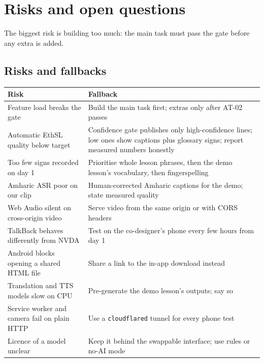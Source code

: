 \documentclass[11pt,a4paper]{article}
\newcommand{\code}[1]{\texttt{#1}}
\begin{document}
\section{Risks and open questions}

The biggest risk is building too much: the main task must pass the gate before any extra is added.

\subsection{Risks and fallbacks}
\begin{xltabular}{\textwidth}{@{}>{\raggedright\arraybackslash}p{5.6cm} X@{}}
\toprule
\textbf{Risk} & \textbf{Fallback} \\
\midrule
\endhead
Feature load breaks the gate & Build the main task first; extras only after AT-02 passes \\
Automatic EthSL quality below target & Confidence gate publishes only high-confidence lines; low ones show captions plus glossary signs; report measured numbers honestly \\
Too few signs recorded on day 1 & Prioritise whole lesson phrases, then the demo lesson's vocabulary, then fingerspelling \\
Amharic ASR poor on our clip & Human-corrected Amharic captions for the demo; state measured quality \\
Web Audio silent on cross-origin video & Serve video from the same origin or with CORS headers \\
TalkBack behaves differently from NVDA & Test on the co-designer's phone every few hours from day 1 \\
Android blocks opening a shared HTML file & Share a link to the in-app download instead \\
Translation and TTS models slow on CPU & Pre-generate the demo lesson's outputs; say so \\
Service worker and camera fail on plain HTTP & Use a \code{cloudflared} tunnel for every phone test \\
Licence of a model unclear & Keep it behind the swappable interface; use rules or no-AI mode \\
\bottomrule
\end{xltabular}
\end{document}
